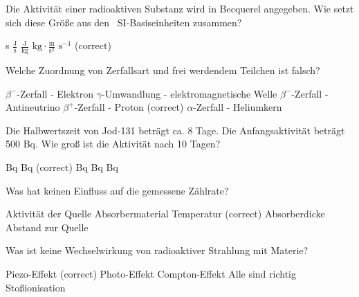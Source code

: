 \documentclass[11pt]{exam}
\begin{document}
\setlength{\voffset}{-0.5in}
\setlength{\headsep}{5pt}

\hspace{2mm}
 \hspace{5mm}
\vspace{4mm}

\begin{questions}

\question Die Aktivität einer radioaktiven Substanz wird in Becquerel angegeben. Wie setzt sich diese Größe aus den  SI-Basiseinheiten zusammen?

\begin{choices}
	\choice s
	\choice \( \frac{\text{J}}{\text{s}} \)
	\choice \( \frac{\text{J}}{\text{kg}} \)
	\choice \( \text{kg}\cdot\frac{\text{m}}{\text{s}^2} \)
	\choice \( \text{s}^{-1} \) (correct)
\end{choices}

\vspace{3mm}\question Welche Zuordnung von Zerfallsart und frei werdendem Teilchen ist falsch?

\begin{choices}
	\choice \( \beta^- \)-Zerfall - Elektron
	\choice \( \gamma \)-Umwandlung - elektromagnetische Welle
	\choice \( \beta^- \)-Zerfall - Antineutrino
	\choice \( \beta^+ \)-Zerfall - Proton (correct)
	\choice \( \alpha \)-Zerfall - Heliumkern
\end{choices}

\vspace{3mm}\question Die Halbwertszeit von Jod-131 beträgt ca. 8 Tage. Die Anfangsaktivität beträgt 500 Bq. Wie groß ist die Aktivität nach 10 Tagen?

\begin{choices}
	 Bq
	 Bq (correct)
	 Bq
	 Bq
	 Bq
\end{choices}

\vspace{3mm}\question Was hat keinen Einfluss auf die gemessene Zählrate?

\begin{choices}
	\choice Aktivität der Quelle
	\choice Absorbermaterial
	\choice Temperatur (correct)
	\choice Absorberdicke
	\choice Abstand zur Quelle
\end{choices}

\vspace{3mm}\question Was ist keine Wechselwirkung von radioaktiver Strahlung mit Materie?

\begin{choices}
	\choice Piezo-Effekt (correct)
	\choice Photo-Effekt
	\choice Compton-Effekt
	\choice Alle sind richtig
	\choice Stoßionisation
\end{choices}

\vspace{3mm}\end{questions}
\end{document}
